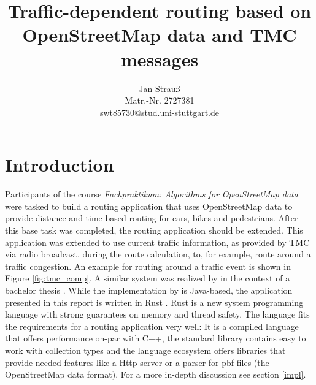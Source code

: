 \documentclass[a4paper]{scrartcl}
\title{Traffic-dependent routing based on OpenStreetMap data and TMC messages}
\author{
  Jan Strauß\\
  Matr.-Nr. 2727381\\
  swt85730@stud.uni-stuttgart.de
}
\date{}
\begin{document}
\maketitle


\section{Introduction}
Participants of the course \textit{Fachpraktikum: Algorithms for OpenStreetMap data} were tasked to build a routing application that uses OpenStreetMap \cite{osm_main} data to provide distance and time based routing for cars, bikes and pedestrians. After this base task was completed, the routing application should be extended. This application was extended to use current traffic information, as provided by TMC via radio broadcast, during the route calculation, to, for example, route around a traffic congestion. An example for routing around a traffic event is shown in Figure \ref{fig:tmc_comp}. A similar system was realized by \citeauthor{sanwald2013} in the context of a bachelor thesis \cite{sanwald2013}. While the implementation by \citeauthor{sanwald2013} is Java-based, the application presented in this report is written in Rust \cite{rust_main}. Rust is a new system programming language with strong guarantees on memory and thread safety. The language fits the requirements for a routing application very well: It is a compiled language that offers performance on-par with C++, the standard library contains easy to work with collection types and the language ecosystem offers libraries that provide needed features like a Http server or a parser for pbf files (the OpenStreetMap data format). For a more in-depth discussion see section \ref{impl}.
\end{document}
